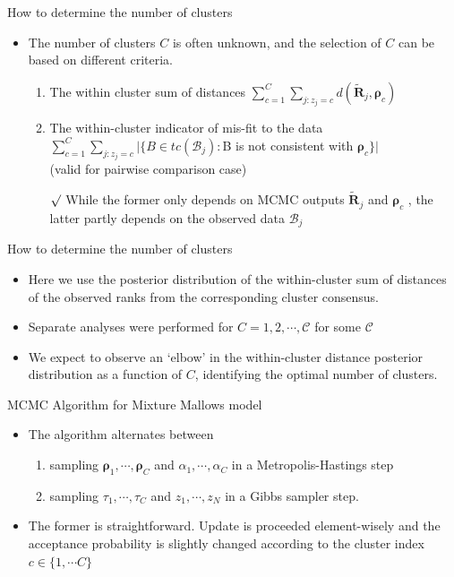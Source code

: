 \documentclass[11pt]{beamer}
\newcommand{\rmk}{$\surd$}
\begin{document}
\begin{frame}{How to determine the number of clusters}
\begin{itemize}
    \item The number of clusters $C$ is often unknown, and the selection of $C$ can be based on different criteria.
    \begin{enumerate}
        \item The within cluster sum of distances $\sum_{c=1}^C \sum_{j : z_j=c} d(\tilde{\mathbf{R}}_j, \boldsymbol{\rho}_c)$
        \item The within-cluster indicator of mis-fit to the data \\$\sum_{c=1}^C \sum_{j : z_j=c} \big|\{B\in tc(\mathcal{B}_j):$B is not consistent with $\boldsymbol{\rho}_c\} \big|$ \\
        (valid for pairwise comparison case)
        \item[\rmk] While the former only depends on MCMC outputs $\tilde{\mathbf{R}}_j$ and $\boldsymbol{\rho}_c$ , the latter partly depends on the observed data $\mathcal{B}_j$
    \end{enumerate}
\end{itemize}
\end{frame}

\begin{frame}{How to determine the number of clusters}
\begin{itemize}
    \item Here we use the posterior distribution of the within-cluster sum of distances of the observed ranks from the corresponding cluster consensus.
    \item Separate analyses were performed for $C=1,2,\cdots, \mathcal{C}$ for some $\mathcal{C}$
    \item We expect to observe an `elbow' in the within-cluster distance posterior distribution as a function of $C$, identifying the optimal number of clusters. 
\end{itemize}
\end{frame}

\begin{frame}{MCMC Algorithm for Mixture Mallows model}
\begin{itemize}
    \item The algorithm alternates between 
    \begin{enumerate}
        \item sampling $\boldsymbol{\rho}_1, \cdots, \boldsymbol{\rho}_C$ and $\alpha_1, \cdots, \alpha_C$ in a Metropolis-Hastings step
        \item sampling $\tau_1, \cdots, \tau_C$ and $z_1, \cdots, z_N$ in a Gibbs sampler step.
    \end{enumerate}
    \item The former is straightforward. Update is proceeded element-wisely and the acceptance probability is slightly changed according to the cluster index $c\in \{1,\cdots C\}$
\end{itemize}
\end{frame}
\end{document}
